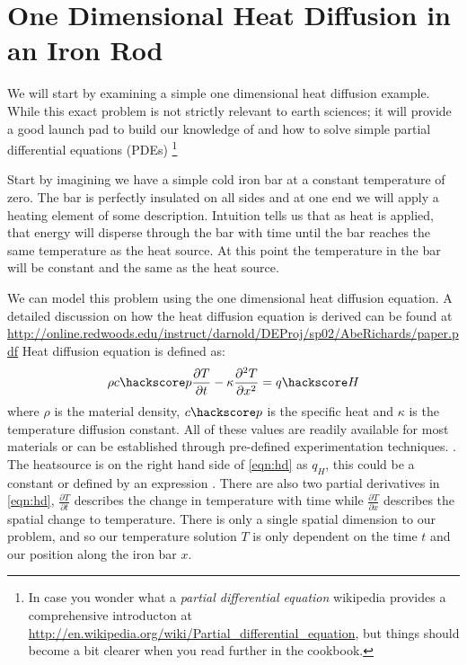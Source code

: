 
%
%
%

\section{One Dimensional Heat Diffusion in an Iron Rod}
We will start by examining a simple one dimensional heat diffusion example. While this exact problem is not strictly relevant to earth sciences; it will provide a good launch pad to build our knowledge of \ESCRIPT and how to solve simple partial differential equations (PDEs) \footnote{In case you wonder what a 
\textit{partial differential equation} wikipedia provides a 
comprehensive introducton at 
\url{http://en.wikipedia.org/wiki/Partial_differential_equation},
but things should become a bit clearer when you read further in the cookbook.}



Start by imagining we have a simple cold iron bar at a constant temperature of zero.
The bar is perfectly insulated on all sides and at one end we will apply a heating element of some description. Intuition tells us that as heat is applied, that energy will disperse through the bar with time until the bar reaches the same temperature as the heat source. At this point the temperature in the bar will be constant and the same as the heat source.

We can model this problem using the one dimensional heat diffusion equation. A detailed discussion on how the heat diffusion equation is derived can be found at 
\url{http://online.redwoods.edu/instruct/darnold/DEProj/sp02/AbeRichards/paper.pdf}
Heat diffusion equation is defined as:
\begin{equation}
\rho c\hackscore p \frac{\partial T}{\partial t} - \kappa \frac{\partial^{2} T}{\partial x^{2}} = q\hackscore H 
\label{eqn:hd}
\end{equation}
where $\rho$ is the material density, $c\hackscore p$ is the specific heat and $\kappa$ is the temperature diffusion constant. All of these values are readily available for most materials or can be established through pre-defined experimentation techniques. .
The heatsource is on the right hand side of \eqref{eqn:hd} as $q_{H}$, this could be a constant or defined by an expression . There are also two partial derivatives in \eqref{eqn:hd}, $\frac{\partial T}{\partial t}$ describes the change in temperature with time while $\frac{\partial T}{\partial x}$ describes the spatial change to temperature. There is only a single spatial dimension to our problem, and so our temperature solution $T$ is only dependent on the time $t$ and our position along the iron bar $x$.

